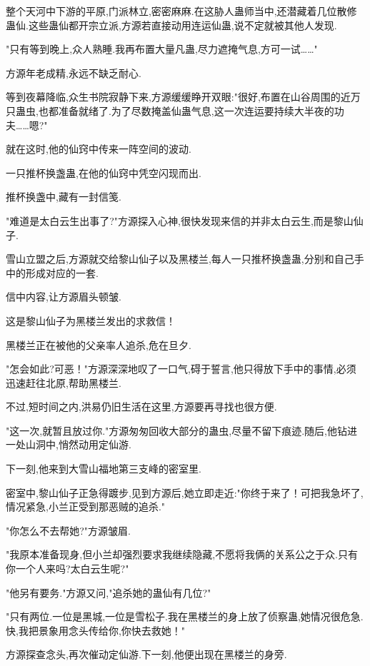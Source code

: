 \begin{this_body}
整个天河中下游的平原,门派林立,密密麻麻.在这胁人蛊师当中,还潜藏着几位散修蛊仙.这些蛊仙都开宗立派,方源若直接动用连运仙蛊,说不定就被其他人发现.

"只有等到晚上,众人熟睡.我再布置大量凡蛊,尽力遮掩气息,方可一试……"

方源年老成精,永远不缺乏耐心.

等到夜幕降临,众生书院寂静下来,方源缓缓睁开双眼:"很好,布置在山谷周围的近万只蛊虫,也都准备就绪了.为了尽数掩盖仙蛊气息,这一次连运要持续大半夜的功夫……嗯?"

就在这时,他的仙窍中传来一阵空间的波动.

一只推杯换盏蛊,在他的仙窍中凭空闪现而出.

推杯换盏中,藏有一封信笺.

"难道是太白云生出事了?"方源探入心神,很快发现来信的并非太白云生,而是黎山仙子.

雪山立盟之后,方源就交给黎山仙子以及黑楼兰,每人一只推杯换盏蛊,分别和自己手中的形成对应的一套.

信中内容,让方源眉头顿皱.

这是黎山仙子为黑楼兰发出的求救信！

黑楼兰正在被他的父亲率人追杀,危在旦夕.

"怎会如此?可恶！"方源深深地叹了一口气,碍于誓言,他只得放下手中的事情,必须迅速赶往北原,帮助黑楼兰.

不过,短时间之内,洪易仍旧生活在这里,方源要再寻找也很方便.

"这一次,就暂且放过你."方源匆匆回收大部分的蛊虫,尽量不留下痕迹.随后,他钻进一处山洞中,悄然动用定仙游.

下一刻,他来到大雪山福地第三支峰的密室里.

密室中,黎山仙子正急得踱步,见到方源后,她立即走近:"你终于来了！可把我急坏了,情况紧急,小兰正受到那恶贼的追杀."

"你怎么不去帮她?"方源皱眉.

"我原本准备现身,但小兰却强烈要求我继续隐藏,不愿将我俩的关系公之于众.只有你一个人来吗?太白云生呢?"

"他另有要务."方源又问,"追杀她的蛊仙有几位?"

"只有两位.一位是黑城,一位是雪松子.我在黑楼兰的身上放了侦察蛊,她情况很危急.快,我把景象用念头传给你,你快去救她！"

方源探查念头,再次催动定仙游.下一刻,他便出现在黑楼兰的身旁.

\end{this_body}

